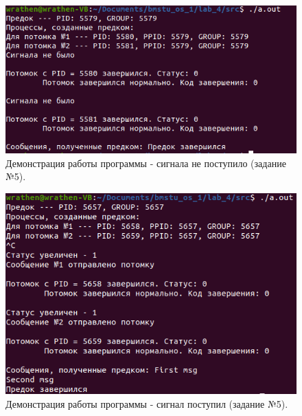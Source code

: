\documentclass[12pt]{report}
\begin{document}
	\begin{figure}[H]
		
		\centering
		
		\includegraphics[width=0.85\linewidth]{img/task_05_no.png}
		\caption{Демонстрация работы программы - сигнала не поступило (задание №5).}
		
		\label{fig:task_05}
		
	\end{figure}

	\begin{figure}[H]
		
		\centering
		
		\includegraphics[width=0.85\linewidth]{img/task_05_yes.png}
		\caption{Демонстрация работы программы - сигнал поступил (задание №5).}
		
		\label{fig:task_05}
		
	\end{figure}
\end{document}
